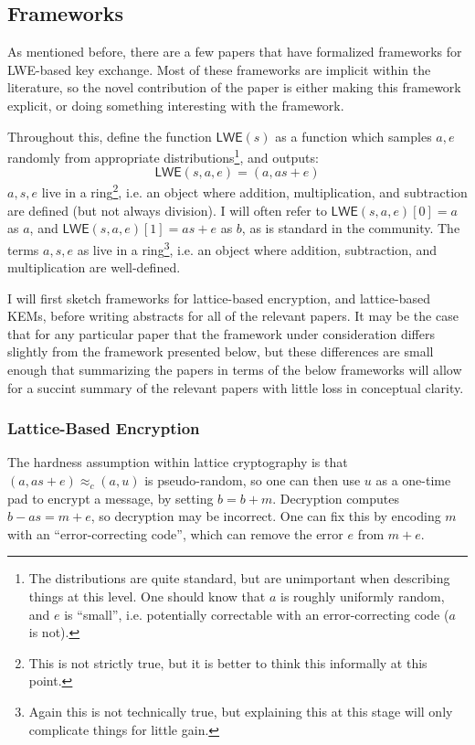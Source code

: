 \documentclass{article}
\newcommand{\LWE}{\mathsf{LWE}}
\begin{document}
\subsection{Frameworks}
As mentioned before, there are a few papers that have formalized frameworks for LWE-based key exchange.
Most of these frameworks are implicit within the literature, so the novel contribution of the paper is either making this framework explicit, or doing something interesting with the framework.

Throughout this, define the function $\LWE(s)$ as a function which samples $a, e$ randomly from appropriate distributions\footnote{The distributions are quite standard, but are unimportant when describing things at this level.
One should know that $a$ is roughly uniformly random, and $e$ is ``small'', i.e. potentially correctable with an error-correcting code ($a$ is not).}, and outputs:
\begin{equation}
\LWE(s, a,  e) = (a, as + e)
\end{equation}
$a, s, e$ live in a ring\footnote{This is not strictly true, but it is better to think this informally at this point.}, i.e. an object where addition, multiplication, and subtraction are defined (but not always division).
I will often refer to $\LWE(s, a, e)[0] = a$ as $a$, and $\LWE(s, a, e)[1] = as+e$ as $b$, as is standard in the community.
The terms $a, s, e$ as live in a ring\footnote{Again this is not technically true, but explaining this at this stage will only complicate things for little gain.}, i.e. an object where addition, subtraction, and multiplication are well-defined.

I will first sketch frameworks for lattice-based encryption, and lattice-based KEMs, before writing abstracts for all of the relevant papers.
It may be the case that for any particular paper that the framework under consideration differs slightly from the framework presented below, but these differences are small enough that summarizing the papers in terms of the below frameworks will allow for a succint summary of the relevant papers with little loss in conceptual clarity.

\subsubsection{Lattice-Based Encryption}

The hardness assumption within lattice cryptography is that $(a, as + e)\approx_c (a, u)$ is pseudo-random, so one can then use $u$ as a one-time pad to encrypt a message, by setting $b = b + m$.
Decryption computes $b - as = m + e$, so decryption may be incorrect.
One can fix this by encoding $m$ with an ``error-correcting code'', which can remove the error $e$ from $m+e$.
\end{document}
